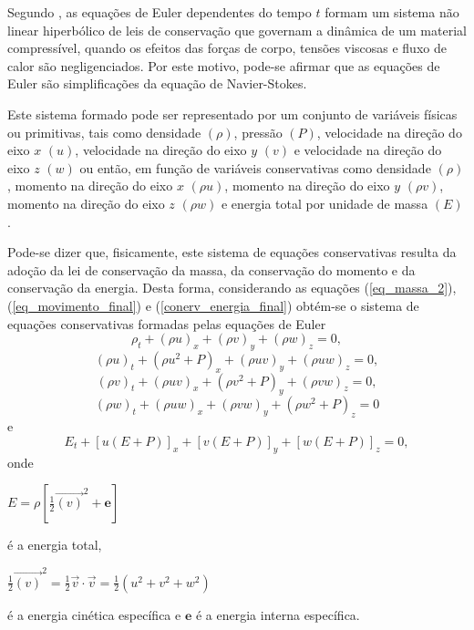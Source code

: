 Segundo , as equações de Euler dependentes do tempo $t$ formam um sistema não linear hiperbólico de leis de conservação que governam a dinâmica de um material compressível, quando os efeitos das forças de corpo, tensões viscosas e fluxo de calor são negligenciados. Por este motivo, pode-se afirmar que as equações de Euler são simplificações da equação de Navier-Stokes.

Este sistema formado pode ser representado por um conjunto de variáveis físicas ou primitivas, tais como densidade $( \rho)$, pressão $(P)$, velocidade na direção do eixo $x$ $(u)$, velocidade na direção do eixo $y$ $(v)$ e velocidade na direção do eixo $z$ $(w)$ ou então, em função de variáveis conservativas como densidade $( \rho)$, momento na direção do eixo $x$ $( \rho u)$, momento na direção do eixo $y$ $( \rho v)$, momento na direção do eixo $z$ $( \rho w)$ e energia total por unidade de massa $( \textit{E})$.

Pode-se dizer que, fisicamente, este sistema de equações conservativas resulta da adoção da lei de conservação da massa, da conservação do momento e da conservação da energia. Desta forma, considerando as equações (\ref{eq_massa_2}), (\ref{eq_movimento_final}) e (\ref{conerv_energia_final}) obtém-se o sistema de equações conservativas formadas pelas equações de Euler
\begin{equation} \label{massasis}
\rho_{t} + ( \rho u)_{x} + ( \rho v)_{y} + ( \rho w)_{z} = 0,
\end{equation}
\begin{equation} \label{momentox}
( \rho u)_{t} + ( \rho u^{2} + P )_{x} + ( \rho uv)_{y} + ( \rho uw)_{z} = 0,
\end{equation}
\begin{equation} \label{momentoy}
( \rho v)_{t} + ( \rho uv)_{x} + ( \rho v^{2} + P )_{y}  + ( \rho vw)_{z} = 0,
\end{equation}
\begin{equation} \label{momentoz}
( \rho w)_{t} + ( \rho uw)_{x} + ( \rho vw)_{y} + ( \rho w^{2} + P )_{z} = 0
\end{equation}
e
\begin{equation} \label{energiasis}
\textit{E}_{t} + [u( \textit{E}+P)]_{x} + [v( \textit{E}+P)]_{y} + [w( \textit{E}+P)]_{z} = 0,
\end{equation} 
onde
\begin{center} \label{Energi_T}
 $ \textit{E} = \rho \left[ \frac{1}{2} \vec{(v)}^{2} + \textbf{e} \right] $ 
\end{center}
 é a energia total,
\begin{center}
 $  \frac{1}{2} \vec{(v)}^{2} = \frac{1}{2} \vec{v} \cdot \vec{v} = \frac{1}{2} \left( u^2 + v^2 + w^2 \right) $ 
\end{center}
é a energia cinética específica e $ \textbf{e} $ é a energia interna específica.

